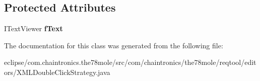 \subsection*{Protected Attributes}
\begin{DoxyCompactItemize}
\item 
I\+Text\+Viewer {\bfseries f\+Text}\hypertarget{classcom_1_1chaintronics_1_1the78mole_1_1reqtool_1_1editors_1_1XMLDoubleClickStrategy_acbbdde13a3f4d76daaa4c053fe5c8d68}{}\label{classcom_1_1chaintronics_1_1the78mole_1_1reqtool_1_1editors_1_1XMLDoubleClickStrategy_acbbdde13a3f4d76daaa4c053fe5c8d68}

\end{DoxyCompactItemize}


The documentation for this class was generated from the following file\+:\begin{DoxyCompactItemize}
\item 
eclipse/com.\+chaintronics.\+the78mole/src/com/chaintronics/the78mole/reqtool/editors/X\+M\+L\+Double\+Click\+Strategy.\+java\end{DoxyCompactItemize}
